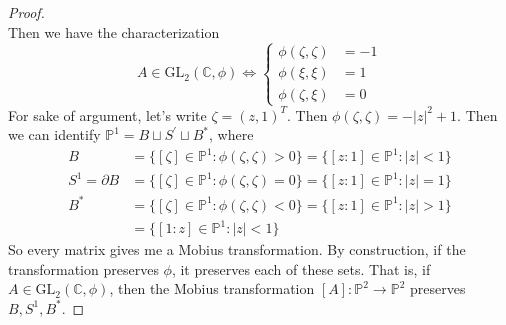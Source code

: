 \begin{proof}
\begin{equation}
    \end{equation}
    Then we have the characterization
    \begin{equation}
      A \in \mathrm{GL}_2 (\mathbb{C}, \phi) \iff \begin{cases} 
        \phi(\zeta, \zeta) & = -1 \\ 
        \phi(\xi, \xi) & = 1 \\ 
        \phi(\zeta, \xi) & = 0
      \end{cases}
    \end{equation}
    For sake of argument, let's write $\zeta = (z, 1)^T$. Then $\phi(\zeta, \zeta) = - |z|^2 + 1$. Then we can identify $\mathbb{P}^1 = B \sqcup S^\prime \sqcup B^\ast$, where 
    \begin{align}
      B & = \{ [\zeta] \in \mathbb{P}^1 \colon \phi(\zeta, \zeta) > 0 \} = \{ [z : 1] \in \mathbb{P}^1 \colon |z| < 1 \} \\ 
      S^1 = \partial B & = \{ [\zeta] \in \mathbb{P}^1 \colon \phi(\zeta, \zeta) = 0 \} = \{[z : 1] \in \mathbb{P}^1 \colon |z| = 1 \} \\ 
      B^\ast & = \{[\zeta] \in \mathbb{P}^1 \colon \phi(\zeta, \zeta) < 0 \} = \{[z : 1] \in \mathbb{P}^1 \colon |z| > 1 \} \\ 
             & = \{[1 : z] \in \mathbb{P}^1 \colon |z| < 1 \} 
    \end{align}
    So every matrix gives me a Mobius transformation. By construction, if the transformation preserves $\phi$, it preserves each of these sets. That is, if $A \in \mathrm{GL}_2 (\mathbb{C}, \phi)$, then the Mobius transformation $[A] : \mathbb{P}^2 \to \mathbb{P}^2$ preserves $B, S^1, B^\ast$. 


\end{proof}
